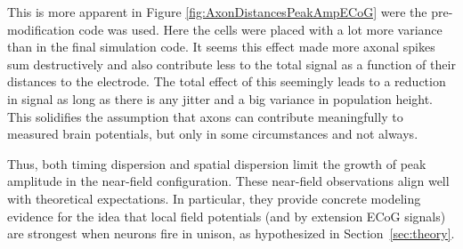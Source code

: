 \documentclass[final, a4paper,masters,en,listoffigures,listoftables,norwegiandates]{NMBU}
\begin{document}
This is more apparent in Figure \ref{fig:AxonDistancesPeakAmpECoG} were the pre-modification code was used. Here the cells were placed with a lot more variance than in the final simulation code. It seems this effect made more axonal spikes sum destructively and also contribute less to the total signal as a function of their distances to the electrode. The total effect of this seemingly leads to a reduction in signal as long as there is any jitter and a big variance in population height. This solidifies the assumption that axons can contribute meaningfully to measured brain potentials, but only in some circumstances and not always.

Thus, both timing dispersion and spatial dispersion limit the growth of peak amplitude in the near-field configuration. These near-field observations align well with theoretical expectations. In particular, they provide concrete modeling evidence for the idea that local field potentials (and by extension ECoG signals) are strongest when neurons fire in unison, as hypothesized in Section~\ref{sec:theory}.
\end{document}
